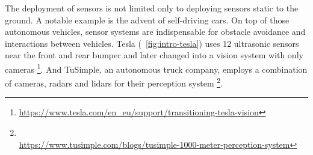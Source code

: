 The deployment of sensors is not limited only to deploying sensors static to the ground.
A notable example is the advent of self-driving cars.
On top of those autonomous vehicles, sensor systems are indispensable for obstacle avoidance and interactions between vehicles.
Tesla (~\ref{fig:intro-tesla}) uses 12 ultrasonic sensors 
near the front and rear bumper 
and later changed into a vision system with only cameras 
\footnote{\url{https://www.tesla.com/en_eu/support/transitioning-tesla-vision}}. 
And TuSimple, an autonomous truck company, employs a combination of cameras, radars and lidars 
for their perception system \footnote{\\\url{https://www.tusimple.com/blogs/tusimple-1000-meter-perception-system}}. 

\begin{figure}[ht] 
    \centering 


\end{figure}
